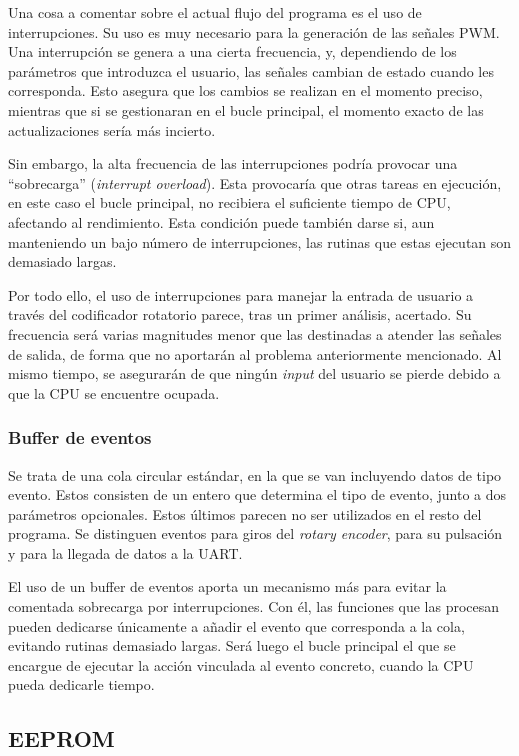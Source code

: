 Una cosa a comentar sobre el actual flujo del programa es el uso de interrupciones. Su uso es muy necesario para la generación de las señales PWM. Una interrupción se genera a una cierta frecuencia, y, dependiendo de los parámetros que introduzca el usuario, las señales cambian de estado cuando les corresponda. Esto asegura que los cambios se realizan en el momento preciso, mientras que si se gestionaran en el bucle principal, el momento exacto de las actualizaciones sería más incierto.

Sin embargo, la alta frecuencia de las interrupciones podría provocar una ``sobrecarga'' (\textit{interrupt overload}). Esta provocaría que otras tareas en ejecución, en este caso el bucle principal, no recibiera el suficiente tiempo de CPU, afectando al rendimiento. Esta condición puede también darse si, aun manteniendo un bajo número de interrupciones, las rutinas que estas ejecutan son demasiado largas.

Por todo ello, el uso de interrupciones para manejar la entrada de usuario a través del codificador rotatorio parece, tras un primer análisis, acertado. Su frecuencia será varias magnitudes menor que las destinadas a atender las señales de salida, de forma que no aportarán al problema anteriormente mencionado. Al mismo tiempo, se asegurarán de que ningún \textit{input} del usuario se pierde debido a que la CPU se encuentre ocupada. \cite{chapman}

\subsubsection{Buffer de eventos} Se trata de una cola circular estándar, en la que se van incluyendo datos de tipo evento. Estos consisten de un entero que determina el tipo de evento, junto a dos parámetros opcionales. Estos últimos parecen no ser utilizados en el resto del programa. Se distinguen eventos para giros del \textit{rotary encoder}, para su pulsación y para la llegada de datos a la UART.

El uso de un buffer de eventos aporta un mecanismo más para evitar la comentada sobrecarga por interrupciones. Con él, las funciones que las procesan pueden dedicarse únicamente a añadir el evento que corresponda a la cola, evitando rutinas demasiado largas. Será luego el bucle principal el que se encargue de ejecutar la acción vinculada al evento concreto, cuando la CPU pueda dedicarle tiempo.

\subsection{EEPROM}

